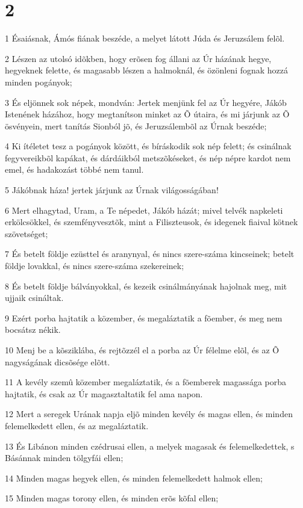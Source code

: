 \chapter{2}

\par 1 Ésaiásnak, Ámós fiának beszéde, a melyet látott Júda és Jeruzsálem felõl.
\par 2 Lészen az utolsó idõkben, hogy erõsen fog állani az Úr házának hegye, hegyeknek felette, és magasabb lészen a halmoknál, és özönleni fognak hozzá minden pogányok;
\par 3 És eljönnek sok népek, mondván: Jertek menjünk fel az Úr hegyére, Jákób Istenének házához, hogy megtanítson minket az Õ útaira, és mi járjunk az Õ ösvényein, mert tanítás Sionból jõ, és Jeruzsálembõl az Úrnak beszéde;
\par 4 Ki ítéletet tesz a pogányok között, és bíráskodik sok nép felett; és csinálnak fegyvereikbõl kapákat, és dárdáikból metszõkéseket, és nép népre kardot nem emel, és hadakozást többé nem tanul.
\par 5 Jákóbnak háza! jertek járjunk az Úrnak világosságában!
\par 6 Mert elhagytad, Uram, a Te népedet, Jákób házát; mivel telvék napkeleti erkölcsökkel, és szemfényvesztõk, mint a  Filiszteusok, és idegenek fiaival kötnek szövetséget;
\par 7 És betelt földje ezüsttel és aranynyal, és nincs szere-száma kincseinek; betelt földje lovakkal, és nincs szere-száma szekereinek;
\par 8 És betelt földje bálványokkal, és kezeik csinálmányának hajolnak meg, mit ujjaik csináltak.
\par 9 Ezért porba hajtatik a közember, és megaláztatik a fõember, és meg nem bocsátsz nékik.
\par 10 Menj be a kõsziklába, és rejtõzzél el a porba az Úr félelme elõl, és az Õ nagyságának dicsõsége elõtt.
\par 11 A kevély szemû közember megaláztatik, és a fõemberek magassága porba hajtatik, és csak az Úr magasztaltatik fel ama napon.
\par 12 Mert a seregek Urának napja eljõ minden kevély és magas ellen, és minden felemelkedett ellen, és az megaláztatik.
\par 13 És Libánon minden czédrusai ellen, a melyek magasak és felemelkedettek, s Básánnak minden tölgyfái ellen;
\par 14 Minden magas hegyek ellen, és minden felemelkedett halmok ellen;
\par 15 Minden magas torony ellen, és minden erõs kõfal ellen;
